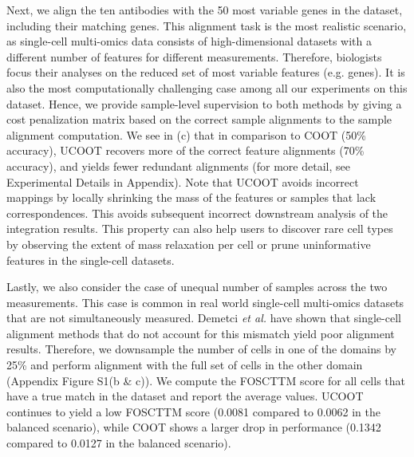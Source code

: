 Next, we align the ten antibodies with
the 50 most variable genes in the dataset, including their matching genes.
This alignment task is the most realistic scenario, as single-cell multi-omics data
consists of high-dimensional datasets with a different number of features for different measurements.
Therefore, biologists focus their analyses on the reduced set of most variable features (e.g. genes).
It is also the most computationally challenging case among all our experiments on this dataset.
Hence, we provide sample-level supervision to both methods by giving a cost penalization matrix
based on the correct sample alignments to the sample alignment computation.
We see in (c) that in comparison to COOT (50\% accuracy),
UCOOT recovers more of the correct feature alignments (70\% accuracy),
and yields fewer redundant alignments  (for more detail, see Experimental Details in Appendix).
Note that UCOOT avoids incorrect mappings by locally shrinking the mass of the features or samples
that lack correspondences. This avoids subsequent incorrect downstream analysis of
the integration results. This property can also help users to discover rare cell types
by observing the extent of mass relaxation per cell or prune uninformative features in
the single-cell datasets.


Lastly, we also consider the case of unequal number of samples across the two measurements.
This case is common in real world single-cell multi-omics datasets that are not
simultaneously measured. Demetci \textit{et al.} \citep{Demetci22-2} have shown that
single-cell alignment methods that do not account for this mismatch yield poor alignment results.
Therefore, we downsample the number of cells in one of the domains by 25\%
and perform alignment with the full set of cells in the other domain (Appendix Figure S1(b \& c)).
We compute the FOSCTTM score for all cells that have a true match in the dataset and
report the average values. UCOOT continues to yield a low FOSCTTM score (0.0081 compared to 0.0062
in the balanced scenario), while COOT shows a larger drop in performance
(0.1342 compared to 0.0127 in the balanced scenario).

